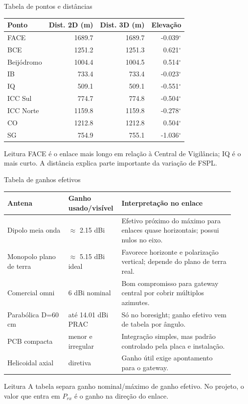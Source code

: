 \documentclass[aspectratio=169]{beamer}
\begin{document}
\begin{frame}{Tabela de pontos e distâncias}
\small
\begin{table}
\centering
\scriptsize
\begin{tabular}{lrrr}
\toprule
Ponto & Dist. 2D (m) & Dist. 3D (m) & Elevação \\
\midrule
FACE & 1689.7 & 1689.7 & -0.039$^\circ$ \\
BCE & 1251.2 & 1251.3 & 0.621$^\circ$ \\
Beijódromo & 1004.4 & 1004.5 & 0.514$^\circ$ \\
IB & 733.4 & 733.4 & -0.023$^\circ$ \\
IQ & 509.1 & 509.1 & -0.551$^\circ$ \\
ICC Sul & 774.7 & 774.8 & -0.504$^\circ$ \\
ICC Norte & 1159.8 & 1159.8 & -0.278$^\circ$ \\
CO & 1212.8 & 1212.8 & 0.504$^\circ$ \\
SG & 754.9 & 755.1 & -1.036$^\circ$ \\
\bottomrule
\end{tabular}
\end{table}
\begin{block}{Leitura}
FACE é o enlace mais longo em relação à Central de Vigilância; IQ é o mais curto. A distância explica parte importante da variação de FSPL.
\end{block}
\end{frame}

\begin{frame}{Tabela de ganhos efetivos}
\small
\begin{table}
\centering
\scriptsize
\begin{tabular}{p{0.26\linewidth}p{0.18\linewidth}p{0.48\linewidth}}
\toprule
Antena & Ganho usado/visível & Interpretação no enlace \\
\midrule
Dipolo meia onda & $\approx$ 2.15 dBi & Efetivo próximo do máximo para enlaces quase horizontais; possui nulos no eixo. \\
Monopolo plano de terra & $\approx$ 5.15 dBi ideal & Favorece horizonte e polarização vertical; depende do plano de terra real. \\
Comercial omni & 6 dBi nominal & Bom compromisso para gateway central por cobrir múltiplos azimutes. \\
Parabólica D=60 cm & até 14.01 dBi PRAC & Só no boresight; ganho efetivo vem de tabela por ângulo. \\
PCB compacta & menor e irregular & Integração simples, mas padrão controlado pela placa e instalação. \\
Helicoidal axial & diretiva & Ganho útil exige apontamento para o gateway. \\
\bottomrule
\end{tabular}
\end{table}
\begin{block}{Leitura}
A tabela separa ganho nominal/máximo de ganho efetivo. No projeto, o valor que entra em $P_{rx}$ é o ganho na direção do enlace.
\end{block}
\end{frame}
\end{document}
